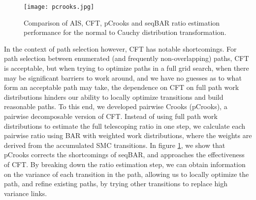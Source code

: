 \begin{figure}
    \centering
    \texttt{[image: pcrooks.jpg]}
    \caption[Comparison of various SMC methods for the normal to Cauchy transformation]{Comparison of AIS, CFT, pCrooks and seqBAR ratio estimation performance for the normal to Cauchy distribution transformation.}
    \label{fig:pcrooks}
\end{figure}

In the context of path selection however, CFT has notable shortcomings. 
For path selection between enumerated (and frequently non-overlapping) paths, CFT is acceptable, but when trying to optimize paths in a full grid search, when there may be significant barriers to work around, and we have no guesses as to what form an acceptable path may take, the dependence on CFT on full path work distributions hinders our ability to locally optimize transitions and build reasonable paths.
To this end, we developed pairwise Crooks (pCrooks), a pairwise decomposable version of CFT. 
Instead of using full path work distributions to estimate the full telescoping ratio in one step, we calculate each pairwise ratio using BAR with weighted work distributions, where the weights are derived from the accumulated SMC transitions.
In figure \ref{fig:pcrooks}, we show that pCrooks corrects the shortcomings of seqBAR, and approaches the effectiveness of CFT.
By breaking down the ratio estimation step, we can obtain information on the variance of each transition in the path, allowing us to locally optimize the path, and refine existing paths, by trying other transitions to replace high variance links.

